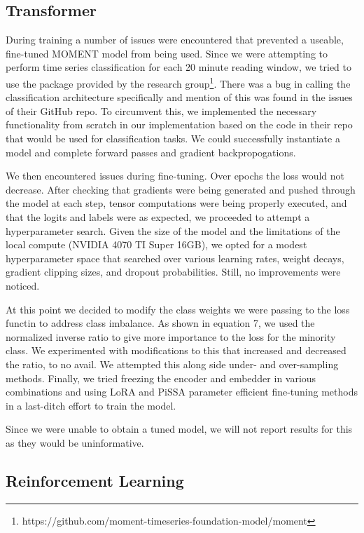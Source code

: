 \documentclass[12pt]{article}
\begin{document}
\clearpage
\subsection{Transformer}
During training a number of issues were encountered that prevented a useable, fine-tuned MOMENT model from being used. Since we
were attempting to perform time series classification for each 20 minute reading window, we tried to use the package provided by
the research group\footnote{https://github.com/moment-timeseries-foundation-model/moment}. There was a bug in calling the classification
architecture specifically and mention of this was found in the issues of their GitHub repo. To circumvent this, we implemented the
necessary functionality from scratch in our implementation based on the code in their repo that would be used for classification
tasks. We could successfully instantiate a model and complete forward passes and gradient backpropogations.

We then encountered issues during fine-tuning. Over epochs the loss would not decrease. After checking that gradients were being
generated and pushed through the model at each step, tensor computations were being properly executed, and that the logits and
labels were as expected, we proceeded to attempt a hyperparameter search. Given the size of the model and the limitations of the
local compute (NVIDIA 4070 TI Super 16GB), we opted for a modest hyperparameter space that searched over various learning rates,
weight decays, gradient clipping sizes, and dropout probabilities. Still, no improvements were noticed.

At this point we decided to modify the class weights we were passing to the loss functin to address class imbalance. As shown
in equation 7, we used the normalized inverse ratio to give more importance to the loss for the minority class. We experimented
with modifications to this that increased and decreased the ratio, to no avail. We attempted this along side under- and over-sampling
methods. Finally, we tried freezing the encoder and embedder in various combinations and using LoRA\cite{Hu2021LoRALA} and 
PiSSA\cite{meng2024pissaprincipalsingularvalues} parameter efficient fine-tuning methods in a last-ditch effort to train the model.

Since we were unable to obtain a tuned model, we will not report results for this as they would be uninformative.

\subsection{Reinforcement Learning}
\end{document}
